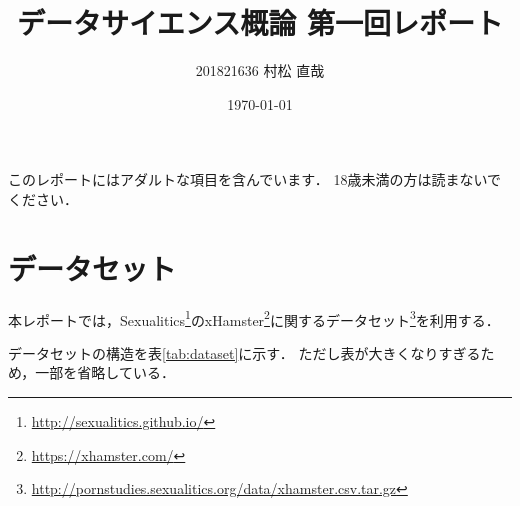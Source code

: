 \documentclass[uplatex]{jsarticle}
\begin{document}
\title{\huge データサイエンス概論 第一回レポート}
\author{201821636 村松 直哉}
\date{\today}
\maketitle

このレポートにはアダルトな項目を含んでいます．
18歳未満の方は読まないでください．

\section{データセット}

本レポートでは，Sexualitics\footnote{\url{http://sexualitics.github.io/}}のxHamster\footnote{\url{https://xhamster.com/}}に関するデータセット\footnote{\url{http://pornstudies.sexualitics.org/data/xhamster.csv.tar.gz}}を利用する．

データセットの構造を表\ref{tab:dataset}に示す．
ただし表が大きくなりすぎるため，一部を省略している．
\end{document}
